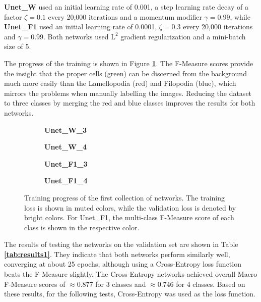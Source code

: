 \textbf{Unet\_W} used an initial learning rate of 0.001, a step learning rate decay of a factor $\zeta = 0.1$ every 20,000 iterations and a momentum modifier $\gamma = 0.99$, while \textbf{Unet\_F1} used an initial learning rate of 0.0001, $\zeta = 0.3$ every 20,000 iterations and $\gamma = 0.99$. Both networks used $\text{L}^2$ gradient regularization and a mini-batch size of 5.

The progress of the training is shown in Figure \textbf{\ref{fig:weighted_f1_training}}. The F-Measure scores provide the insight that the proper cells (green) can be discerned from the background much more easily than the Lamellopodia (red) and Filopodia (blue), which mirrors the problems when manually labelling the images. Reducing the dataset to three classes by merging the red and blue classes improves the results for both networks.\\

\begin {figure}[!htb]
	\begin {subfigure}[b]{0.4\linewidth}
		\scalebox{0.65}{}
		\caption{\textbf{Unet\_W\_3}}
	\end {subfigure}\hspace{1.75cm}
	\begin {subfigure}[b]{0.4\linewidth}
		\scalebox{0.65}{}
		\caption{\textbf{Unet\_W\_4}}
	\end {subfigure}

	\begin {subfigure}[b]{0.4\linewidth}
		\scalebox{0.65}{}
		\caption{\textbf{Unet\_F1\_3}}
	\end {subfigure}\hspace{1.75cm}
	\begin {subfigure}[b]{0.4\linewidth}
		\scalebox{0.65}{}
		\caption{\textbf{Unet\_F1\_4}}
	\end {subfigure}

		\caption[Training progress of the first collection of networks.]{Training progress of the first collection of networks. The training loss is shown in muted colors, while the validation loss is denoted by bright colors. For Unet\_F1, the multi-class F-Measure score of each class is shown in the respective color.}
		\label{fig:weighted_f1_training}
\end {figure}

\noindent The results of testing the networks on the validation set are shown in Table \textbf{\ref{tab:results1}}. They indicate that both networks perform similarly well, converging at about 25 epochs, although using a Cross-Entropy loss function beats the F-Measure slightly. The Cross-Entropy networks achieved overall Macro F-Measure scores of $\approx$0.877 for 3 classes and $\approx$0.746 for 4 classes. Based on these results, for the following tests, Cross-Entropy was used as the loss function.\\ 

